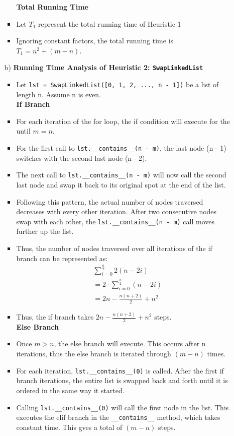 \documentclass[fontsize=11pt]{article}
\begin{document}
\begin{enumerate}
\begin{enumerate}
\begin{itemize}
        \textbf{Total Running Time}
        \item Let $T_1$ represent the total running time of Heuristic 1
        \item Ignoring constant factors, the total running time is $T_1 = n^2 + (m - n)$.\\
    \end{itemize}
    \item[b)] \textbf{Running Time Analysis of Heuristic 2: \texttt{SwapLinkedList}}
    \begin{itemize}
    \item Let \texttt{lst = SwapLinkedList([0, 1, 2, ..., n - 1])} be a list of length n. Assume n is even.\\
        
        \textbf{If Branch}
        \item For each iteration of the for loop, the if condition will execute for the until $m = n$.
        \item For the first call to \texttt{lst.\_\_contains\_\_(n - m)}, the last node (n - 1) switches with the second last node (n - 2).
        \item The next call to \texttt{lst.\_\_contains\_\_(n - m)} will now call the second last node and swap it back to its original spot at the end of the list.
        \item Following this pattern, the actual number of nodes traversed decreases with every other iteration. After two consecutive nodes swap with each other, the \texttt{lst.\_\_contains\_\_(n - m)} call moves further up the list.
        \item Thus, the number of nodes traversed over all iterations of the if branch can be represented as:
        \begin{align}
            & \sum_{i=0}^{\frac{n}{2}}2(n - 2i)\\
            &= 2 \cdot \sum_{i=0}^{\frac{n}{2}} (n - 2i)\\
            &= 2n - \frac{n(n+2)}{2} + n^2
        \end{align}
        \item Thus, the if branch takes $2n - \frac{n(n+2)}{2} + n^2$ steps.\\
        
        \textbf{Else Branch}
        \item Once $m > n$, the else branch will execute. This occurs after n iterations, thus the else branch is iterated through $(m - n)$ times.
        \item For each iteration, \texttt{lst.\_\_contains\_\_(0)} is called. After the first if branch iterations, the entire list is swapped back and forth until it is ordered in the same way it started.
        \item Calling \texttt{lst.\_\_contains\_\_(0)} will call the first node in the list. This executes the elif branch in the \texttt{\_\_contains\_\_} method, which takes constant time. This gves a total of $(m - n)$ steps.\\
        

\end{itemize}
\end{enumerate}
\end{enumerate}
\end{document}
